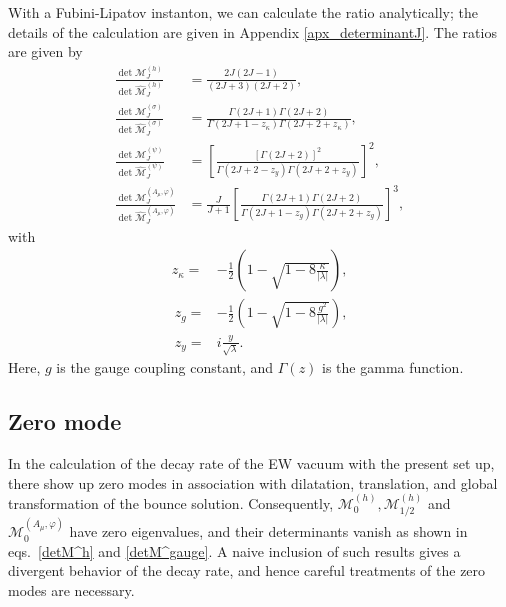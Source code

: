 \documentclass[12pt]{article}
\begin{document}
With a Fubini-Lipatov instanton, we can calculate the ratio
analytically; the details of the calculation are given in Appendix
\ref{apx_determinantJ}.  The ratios are given by
\begin{align}
  \frac{\det \mathcal M^{(h)}_J}{\det \widehat{\mathcal M}^{(h)}_J}
  & = \frac{2J(2J-1)}{(2J+3)(2J+2)},
  \label{detM^h}
  \\
  \frac{\det \mathcal M^{(\sigma)}_J}{\det \widehat{\mathcal M}^{(\sigma)}_J}
  & = \frac{\Gamma(2J+1)\Gamma(2J+2)}{\Gamma(2J+1-z_\kappa)\Gamma(2J+2+z_\kappa)},
  \\
  \frac{\det \mathcal M^{(\psi)}_J}{\det \widehat{\mathcal
      M}^{(\psi)}_J}
  & =
  \left[
    \frac{[\Gamma(2J+2)]^2}{\Gamma\left(2J+2-z_y\right)\Gamma\left(2J+2+z_y\right)}
  \right]^2,
  \\
  \frac{\det \mathcal M^{(A_\mu,\varphi)}_J}{\det \widehat{\mathcal M}^{(A_\mu,\varphi)}_J}
  & = \frac{J}{J+1}
  \left[
    \frac{\Gamma(2J+1)\Gamma(2J+2)}{\Gamma(2J+1-z_g)\Gamma(2J+2+z_g)}
  \right]^3,
  \label{detM^gauge}
\end{align}
with
\begin{align}
  z_\kappa = & -\frac{1}{2}
  \left(
    1-\sqrt{1-8\frac{\kappa}{|\lambda|}}
  \right),\\
  ~z_g = & -\frac{1}{2}
  \left(
    1-\sqrt{1-8\frac{g^2}{|\lambda|}}
  \right),\\
  ~z_y = &
  i\frac{y}{\sqrt{\lambda}}.
\end{align}
Here, $g$ is the gauge coupling constant, and $\Gamma(z)$ is the
gamma function.

\subsection{Zero mode}

In the calculation of the decay rate of the EW vacuum with the present
set up, there show up zero modes in association with dilatation,
translation, and global transformation of the bounce solution.
Consequently, $\mathcal M_0^{(h)},\mathcal M_{1/2}^{(h)}$ and
$\mathcal M_0^{(A_\mu,\varphi)}$ have zero eigenvalues, and their
determinants vanish as shown in eqs.\ \eqref{detM^h} and
\eqref{detM^gauge}.  A naive inclusion of such results gives a
divergent behavior of the decay rate, and hence careful treatments of
the zero modes are necessary.
\end{document}
